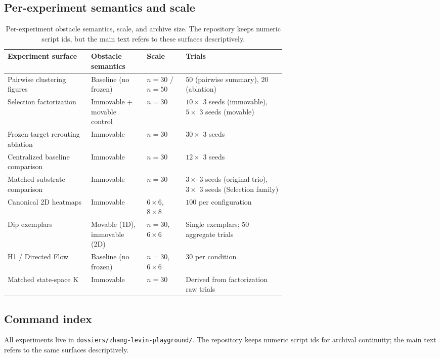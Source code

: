 \documentclass[11pt]{article}
\begin{document}
\subsection{Per-experiment semantics and scale}
\begin{table}[h]
  \centering
  \footnotesize
  \setlength{\tabcolsep}{5pt}
  \renewcommand{\arraystretch}{1.08}
  \begin{tabularx}{\linewidth}{@{}p{0.30\linewidth} p{0.20\linewidth} p{0.14\linewidth} X@{}}
    \toprule
    Experiment surface & Obstacle semantics & Scale & Trials \\
    \midrule
    Pairwise clustering figures & Baseline (no frozen) & $n=30$ / $n=50$ & $50$ (pairwise summary), $20$ (ablation) \\
    Selection factorization & Immovable + movable control & $n=30$ & $10 \times$ 3 seeds (immovable), $5 \times$ 3 seeds (movable) \\
    Frozen-target rerouting ablation & Immovable & $n=30$ & $30 \times$ 3 seeds \\
    Centralized baseline comparison & Immovable & $n=30$ & $12 \times$ 3 seeds \\
    Matched substrate comparison & Immovable & $n=30$ & $3 \times$ 3 seeds (original trio), $3 \times$ 3 seeds (Selection family) \\
    Canonical 2D heatmaps & Immovable & $6{\times}6$, $8{\times}8$ & $100$ per configuration \\
    Dip exemplars & Movable (1D), immovable (2D) & $n=30$, $6{\times}6$ & Single exemplars; $50$ aggregate trials \\
    H1 / Directed Flow & Baseline (no frozen) & $n=30$, $6{\times}6$ & $30$ per condition \\
    Matched state-space K & Immovable & $n=30$ & Derived from factorization raw trials \\
    \bottomrule
  \end{tabularx}
  \caption{Per-experiment obstacle semantics, scale, and archive size. The repository keeps numeric script ids, but the main text refers to these surfaces descriptively.}
  \label{tab:semantics}
\end{table}

\subsection{Command index}
All experiments live in \texttt{dossiers/zhang-levin-playground/}. The repository keeps numeric
script ids for archival continuity; the main text refers to the same surfaces descriptively.
\end{document}
